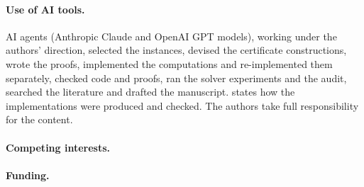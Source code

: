\paragraph{Use of AI tools.}
AI agents (Anthropic Claude and OpenAI GPT models), working under the authors' direction, selected the instances, devised the certificate constructions, wrote the proofs, implemented the computations and re-implemented them separately, checked code and proofs, ran the solver experiments and the audit, searched the literature and drafted the manuscript.
 states how the implementations were produced and checked.
The authors take full responsibility for the content.

\paragraph{Competing interests.}

\paragraph{Funding.}

